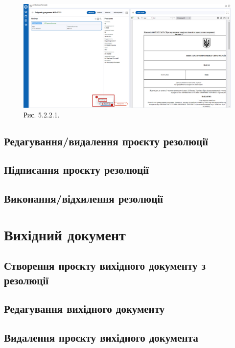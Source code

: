 \begin{figure}[!htbp]
\centerline{\includegraphics[width=\textwidth]{img/5.2.2.1.png}}
\caption{Рис. 5.2.2.1.}
\end{figure}

\subsection{Редагування/видалення проєкту резолюції}

\subsection{Підписання проєкту резолюції}

\subsection{Виконання/відхилення резолюції}

\section{Вихідний документ}

\subsection{Створення проєкту вихідного документу з резолюції}

\subsection{Редагування вихідного документу}

\subsection{Видалення проєкту вихідного документа}

